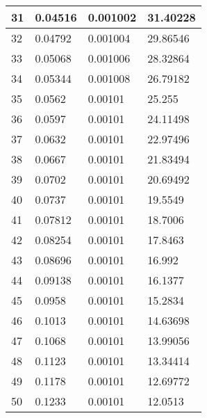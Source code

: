 \documentclass[twocolumn]{article}
\begin{document}
\begin{tabular}{l|l|l|l}
31	&	0.04516	&	0.001002	&	31.40228 \\ \hline
32	&	0.04792	&	0.001004	&	29.86546 \\ \hline
33	&	0.05068	&	0.001006	&	28.32864 \\ \hline
34	&	0.05344	&	0.001008	&	26.79182 \\ \hline
35	&	0.0562	&	0.00101	&	25.255 \\ \hline
36	&	0.0597	&	0.00101	&	24.11498 \\ \hline
37	&	0.0632	&	0.00101	&	22.97496 \\ \hline
38	&	0.0667	&	0.00101	&	21.83494 \\ \hline
39	&	0.0702	&	0.00101	&	20.69492 \\ \hline
40	&	0.0737	&	0.00101	&	19.5549 \\ \hline
41	&	0.07812	&	0.00101	&	18.7006 \\ \hline
42	&	0.08254	&	0.00101	&	17.8463 \\ \hline
43	&	0.08696	&	0.00101	&	16.992 \\ \hline
44	&	0.09138	&	0.00101	&	16.1377 \\ \hline
45	&	0.0958	&	0.00101	&	15.2834 \\ \hline
46	&	0.1013	&	0.00101	&	14.63698 \\ \hline
47	&	0.1068	&	0.00101	&	13.99056 \\ \hline
48	&	0.1123	&	0.00101	&	13.34414 \\ \hline
49	&	0.1178	&	0.00101	&	12.69772 \\ \hline
50	&	0.1233	&	0.00101	&	12.0513 \\ \hline
\end{tabular}
\end{document}
